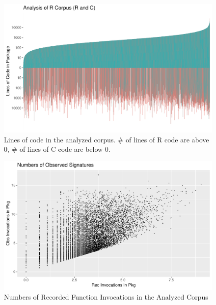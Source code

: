 \documentclass[acmsmall,10pt,review,anonymous]{acmart}\settopmatter{printfolios=true,printccs=false,printacmref=false}
\begin{document}

\begin{figure}[htbp]
\begin{center}
\includegraphics[scale=0.6]{linesofrandccode}
\caption{Lines of code in the analyzed corpus. \# of lines of R code are above 0, \# of lines of C code are below 0.}
\label{allcloc}
\end{center}
\end{figure}

\begin{figure}[htbp]
\begin{center}
\includegraphics[scale=0.6]{recordsbypkg}
\caption{Numbers of Recorded Function Invocations in the Analyzed Corpus}
\label{recorded}
\end{center}
\end{figure}
\end{document}
